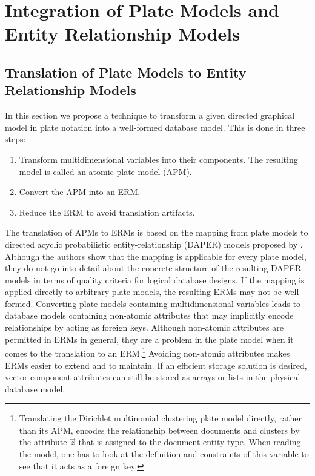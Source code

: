 \section{Integration of Plate Models and Entity Relationship Models}

\subsection{Translation of Plate Models to Entity Relationship Models}
\label{sec:pm2erm}

In this section we propose a technique to transform a given directed graphical model in plate notation into a well-formed database model. This is done in three steps:
\begin{enumerate}
\item Transform multidimensional variables into their components. The resulting model is called an atomic plate model (APM).
\item\label{itm:apm2erm} Convert the APM into an ERM.
\item Reduce the ERM to avoid translation artifacts.
\end{enumerate}
The translation of APMs to ERMs is based on the mapping from plate models to directed acyclic probabilistic entity-relationship (DAPER) models proposed by \textcite{heckerman2007probabilistic}. Although the authors show that the mapping is applicable for every plate model, they do not go into detail about the concrete structure of the resulting DAPER models in terms of quality criteria for logical database designs. If the mapping is applied directly to arbitrary plate models, the resulting ERMs may not be well-formed. Converting plate models containing multidimensional variables leads to database models containing non-atomic attributes that may implicitly encode relationships by acting as foreign keys. Although non-atomic attributes are permitted in ERMs in general, they are a problem in the plate model when it comes to the translation to an ERM.\footnote{Translating the Dirichlet multinomial clustering plate model directly, rather than its APM, encodes the relationship between documents and clusters by the attribute $\vec z$ that is assigned to the document entity type. When reading the model, one has to look at the definition and constraints of this variable to see that it acts as a foreign key.} Avoiding non-atomic attributes makes ERMs easier to extend and to maintain. If an efficient storage solution is desired, vector component attributes can still be stored as arrays or lists in the physical database model.

